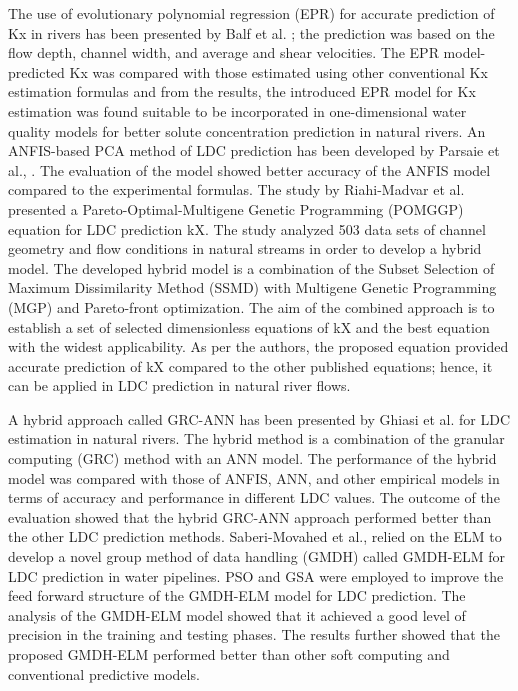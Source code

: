 \documentclass[a4paper,12pt, english]{article}
\begin{document}
The use of evolutionary polynomial regression (EPR) for accurate prediction of Kx  in rivers has been presented by Balf et al. \cite{balf2018evolutionary}; the prediction was based on the flow depth, channel width, and average and shear velocities. The EPR model-predicted Kx was compared with those estimated using other conventional Kx  estimation formulas and from the results, the introduced EPR model for Kx estimation was found suitable to be incorporated in one-dimensional water quality models for better solute concentration prediction in natural rivers. An ANFIS-based PCA method of LDC prediction has been developed by Parsaie et al.,\cite{parsaie2018anfis} . The evaluation of the model showed better accuracy of the ANFIS model compared to the experimental formulas. The study by Riahi-Madvar et al. \cite{riahi2019pareto}
 presented a Pareto-Optimal-Multigene Genetic Programming (POMGGP) equation for LDC prediction kX. The study analyzed 503 data sets of channel geometry and flow conditions in natural streams in order to develop a hybrid model. The developed hybrid model is a combination of the Subset Selection of Maximum Dissimilarity Method (SSMD) with Multigene Genetic Programming (MGP) and Pareto-front optimization. The aim of the combined approach is to establish a set of selected dimensionless equations of kX and the best equation with the widest applicability. As per the authors, the proposed equation provided accurate prediction of kX compared to the other published equations; hence, it can be applied in LDC prediction in natural river flows.

A hybrid approach called GRC-ANN has been presented by Ghiasi et al. \cite{ghiasi2019granular} for LDC estimation in natural rivers. The hybrid method is a combination of the granular computing (GRC) method with an ANN model. The performance of the hybrid model was compared with those of ANFIS, ANN, and other empirical models in terms of accuracy and performance in different LDC values. The outcome of the evaluation showed that the hybrid GRC-ANN approach performed better than the other LDC prediction methods. Saberi-Movahed et al., \cite{saberi2020receiving} relied on the ELM to develop a novel group method of data handling (GMDH) called GMDH-ELM for LDC prediction in water pipelines. PSO and GSA were employed to improve the feed forward structure of the GMDH-ELM model for LDC prediction. The analysis of the GMDH-ELM model showed that it achieved a good level of precision in the training and testing phases. The results further showed that the proposed GMDH-ELM performed better than other soft computing and conventional predictive models.
\end{document}
